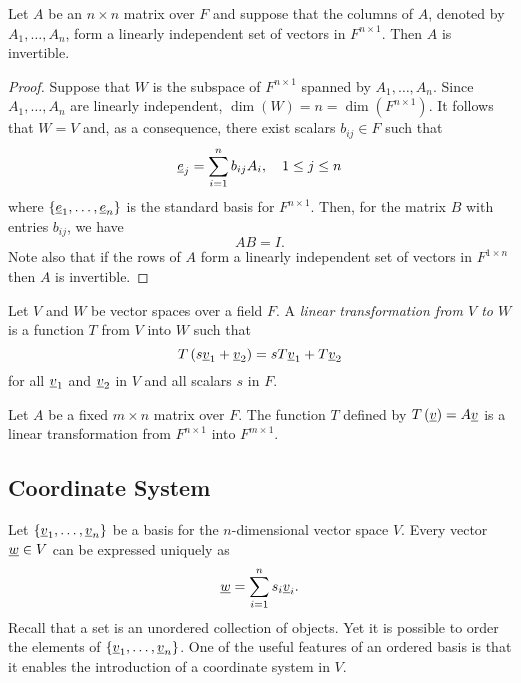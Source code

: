 \begin{theorem}
Let $A$ be an $n \times n$ matrix over $F$ and suppose that the columns of $A$, denoted by $A_1, \ldots, A_n$, form a linearly independent set of vectors in $F^{n \times 1}$.
Then $A$ is invertible.
\end{theorem}
\begin{proof}
Suppose that $W$ is the subspace of $F^{n \times 1}$ spanned by $A_1, \ldots, A_n$.
Since $A_1, \ldots, A_n$ are linearly independent, $\dim(W) = n = \dim(F^{n \times 1})$.
It follows that $W = V$ and, as a consequence, there exist scalars $b_{ij} \in F$ such that
\begin{equation*}
\underline{e}_j = \sum_{i=1}^n b_{ij} A_i, \quad 1 \leq j \leq n
\end{equation*}
where $\left\{ \underline{e}_1, \ldots, \underline{e}_n \right\}$ is the standard basis for $F^{n \times 1}$.
Then, for the matrix $B$ with entries $b_{ij}$, we have
\begin{equation*}
AB = I.
\end{equation*}
Note also that if the rows of $A$ form a linearly independent set of vectors in $F^{1 \times n}$ then $A$ is invertible.
\end{proof}

\begin{definition}
Let $V$ and $W$ be vector spaces over a field $F$.
A \emph{linear transformation from $V$ to $W$} is a function $T$ from $V$ into $W$ such that
\begin{equation*}
T \left( s \underline{v}_1 + \underline{v}_2 \right)
= s T \underline{v}_1 + T \underline{v}_2
\end{equation*}
for all $\underline{v}_1$ and $\underline{v}_2$ in $V$ and all scalars $s$ in $F$.
\end{definition}

\begin{example}
Let $A$ be a fixed $m \times n$ matrix over $F$.
The function $T$ defined by $T \left( \underline{v} \right) = A \underline{v}$ is a linear transformation from $F^{n \times 1}$ into $F^{m \times 1}$.
\end{example}

\subsection{Coordinate System}

Let $\left\{ \underline{v}_1, \ldots, \underline{v}_n \right\}$ be a basis for the $n$-dimensional vector space $V$.
Every vector $\underline{w} \in V$ can be expressed uniquely as
\begin{equation*}
\underline{w} = \sum_{i=1}^n s_i \underline{v}_i.
\end{equation*}
Recall that a set is an unordered collection of objects.
Yet it is possible to order the elements of $\left\{ \underline{v}_1, \ldots, \underline{v}_n \right\}$.
One of the useful features of an ordered basis is that it enables the introduction of a coordinate system in $V$.


